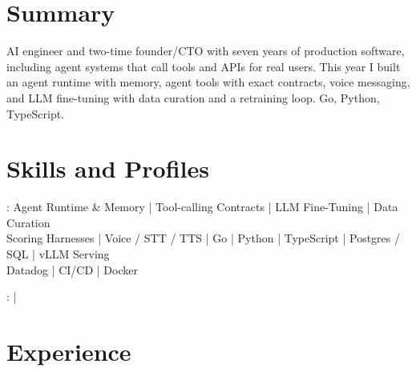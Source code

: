 \documentclass[print]{jack-resume}
\begin{document}
\pagecolor{darkmodeBackground}


\begin{minipage}[t][1cm][t]{.03\textwidth}
    \hfill
\end{minipage}

\section{Summary}
AI engineer and two-time founder/CTO with seven years of production software, including agent systems that call tools and APIs for real users. This year I built an agent runtime with memory, agent tools with exact contracts, voice messaging, and LLM fine-tuning with data curation and a retraining loop. Go, Python, TypeScript.
\sectionsep

\section{Skills and Profiles}
:
Agent Runtime \& Memory \hfill | \hfill
Tool-calling Contracts \hfill | \hfill
LLM Fine-Tuning \hfill | \hfill
Data Curation \\
\hspace{1.0cm} Scoring Harnesses \hfill | \hfill
Voice / STT / TTS \hfill | \hfill
Go \hfill | \hfill
Python \hfill | \hfill
TypeScript \hfill | \hfill
Postgres / SQL \hfill | \hfill
vLLM Serving \\
\hspace{1.0cm} Datadog \hfill | \hfill
CI/CD \hfill | \hfill
Docker \\

\raggedright{
    :
      \href{https://www.linkedin.com/in/jack-sturtevant/}{ \ExternalLink} |
     \href{https://github.com/jacksturt}{ \ExternalLink}}

\section{Experience}
\end{document}
